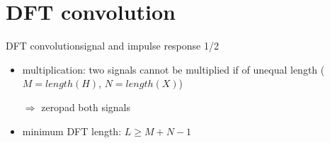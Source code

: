 \section[DFT]{DFT convolution}
	\begin{frame}{DFT convolution}{signal and impulse response 1/2}
		\begin{itemize}
			\item	multiplication: two signals cannot be multiplied if of unequal length ($M = length(H)$, $N = length(X)$)
            \item[$\Rightarrow$] zeropad both signals
			\item	minimum DFT length: $L \geq M+N-1$
		\end{itemize}
		\vspace{50mm}
	\end{frame}


